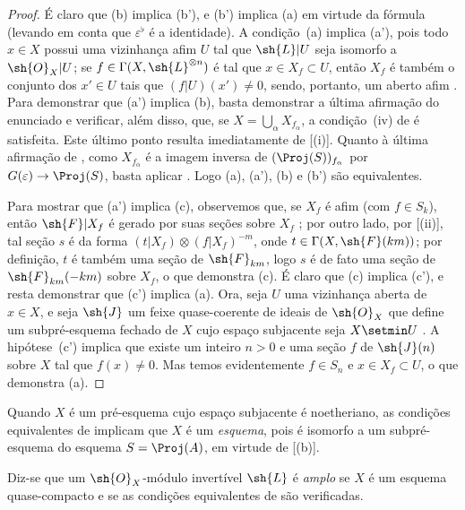 \documentclass[oneside,10pt]{amsart}
\makeatletter
\newcommand{\ega@arrow}[2]{\mathchoice{#1}{#2}{#2}{#2}}
\renewcommand{\to}{\ega@arrow{\longrightarrow}{\rightarrow}}
\let\EGAOriginalLabel\label
\renewcommand{\label}[1]{\phantomsection\EGAOriginalLabel{#1}}
\makeatother
\begin{document}
\begin{proof}
É claro que (b) implica (b'), e (b') implica (a) em virtude da fórmula  (levando em conta que $\varepsilon^\flat$ é a identidade).
A condição~(a) implica (a'), pois todo $x\in X$ possui uma vizinhança afim $U$ tal que $\sh{L}|U$ seja isomorfo a $\sh{O}_X|U$;
se $f\in\Gamma(X,\sh{L}^{\otimes n})$ é tal que $x\in X_f\subset U$, então $X_f$ é também o conjunto dos $x'\in U$ tais que $(f|U)(x')\neq0$, sendo, portanto, um aberto afim .
Para demonstrar que (a') implica (b), basta demonstrar a última afirmação do enunciado e verificar, além disso, que, se $X=\bigcup_\alpha X_{f_\alpha}$, a condição~(iv) de  é satisfeita.
Este último ponto resulta imediatamente de [(i)].
Quanto à última afirmação de , como $X_{f_\alpha}$ é a imagem inversa de $(\Proj(S))_{f_\alpha}$ por $G(\varepsilon)\to\Proj(S)$, basta aplicar .
Logo (a), (a'), (b) e (b') são equivalentes.

Para mostrar que (a') implica (c), observemos que, se $X_f$ é afim (com $f\in S_k$), então $\sh{F}|X_f$ é gerado por suas seções sobre $X_f$ ;
por outro lado, por [(ii)], tal seção $s$ é da forma $(t|X_f)\otimes(f|X_f)^{-m}$, onde $t\in\Gamma(X,\sh{F}(km))$;
por definição, $t$ é também uma seção de $\sh{F}_{km}$, logo $s$ é de fato uma seção de $\sh{F}_{km}(-km)$ sobre $X_f$, o que demonstra (c).
É claro que (c) implica (c'), e resta demonstrar que (c') implica (a).
Ora, seja $U$ uma vizinhança aberta de $x\in X$, e seja $\sh{J}$ um feixe quase-coerente de ideais de $\sh{O}_X$ que define um subpré-esquema fechado de $X$ cujo espaço subjacente seja $X\setmin U$ .
A hipótese~(c') implica que existe um inteiro $n>0$ e uma seção $f$ de $\sh{J}(n)$ sobre $X$ tal que $f(x)\neq0$.
Mas temos evidentemente $f\in S_n$ e $x\in X_f\subset U$, o que demonstra (a).
\end{proof}

Quando $X$ é um pré-esquema cujo espaço subjacente é noetheriano, as condições equivalentes de  implicam que $X$ é um \emph{esquema}, pois é isomorfo a um subpré-esquema do esquema $S=\Proj(A)$, em virtude de [(b)].

\begin{definition}[4.5.3]
\label{II.4.5.3}
Diz-se que um $\sh{O}_X$-módulo invertível $\sh{L}$ é \emph{amplo} se $X$ é um esquema quase-compacto e se as condições equivalentes de  são verificadas.
\end{definition}
\end{document}
